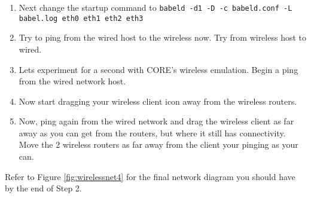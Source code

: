 \documentclass[main.tex]{subfiles}
\begin{document}
\begin{enumerate}[noitemsep,label=$\bullet$,leftmargin=20mm,labelsep=0.5cm]
\item Next change the startup command to \texttt{babeld -d1 -D -c babeld.conf -L babel.log eth0 eth1 eth2 eth3}

\item Try to ping from the wired host to the wireless now.  Try from wireless host to wired.

\item Lets experiment for a second with CORE's wireless emulation.  Begin a ping from the wired network host.

\item Now start dragging your wireless client icon away from the wireless routers.  

\item Now, ping again from the wired network and drag the wireless client as far away as you can get from the routers, but where it still has connectivity.  Move the 2 wireless routers as far away from the client your pinging as your can. 

\end{enumerate}

\noindent Refer to Figure \ref{fig:wirelessnet4} for the final network diagram you should have by the end of Step 2.
\end{document}
